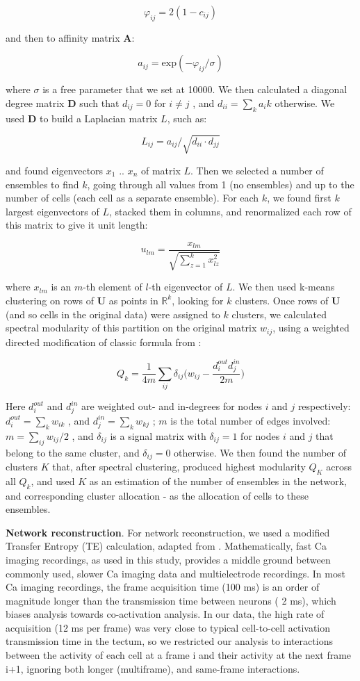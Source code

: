 \documentclass{article}
\begin{document}
$$\varphi_{ij} = 2(1-c_{ij})$$

and then to affinity matrix $\textbf{A}$:

$$a_{ij} = \text{exp}(-\varphi_{ij}/\sigma)$$

where $\sigma$ is a free parameter that we set at 10000. We then calculated a diagonal degree matrix $\textbf{D}$ such that $d_{ij} = 0$ for $i \neq j$ , and $d_{ii} = \sum_k{a_ik}$ otherwise. We used $\textbf{D}$ to build a Laplacian matrix $L$, such as:

$$L_{ij} = a_{ij}/\sqrt{d_{ii}\cdot d_{jj}}$$

and found eigenvectors $x_1$ .. $x_n$ of matrix $L$. Then we selected a number of ensembles to find $k$, going through all values from 1 (no ensembles) and up to the number of cells (each cell as a separate ensemble). For each $k$, we found first $k$ largest eigenvectors of $L$, stacked them in columns, and renormalized each row of this matrix to give it unit length:

$$u_{lm} = \frac{x_{lm}}{\sqrt{\sum_{z=1}^{k}{x_{lz}^2}}}$$

where $x_{lm}$ is an $m$-th element of $l$-th eigenvector of $L$. We then used k-means clustering on rows of $\textbf{U}$ as points in $\mathbb{R}^k$, looking for $k$ clusters. Once rows of $\textbf{U}$ (and so cells in the original data) were assigned to $k$ clusters, we calculated spectral modularity of this partition on the original matrix $w_{ij}$, using a weighted directed modification of classic formula from \citep{newman2006modularity}:

$$Q_k = \frac{1}{4m}\sum_{ij}{\delta_{ij}\Big(w_{ij}-\frac{d^{out}_i d^{in}_j}{2m}}\Big)$$

Here $d^{out}_i$ and $d^{in}_j$ are weighted out- and in-degrees for nodes $i$ and $j$ respectively: $d^{out}_i = \sum_k{w_{ik}}$ , and $d^{in}_j = \sum_k{w_{kj}}$ ; $m$ is the total number of edges involved: $m = \sum_{ij}{w_{ij}}/2$ , and $\delta_{ij}$ is a signal matrix with $\delta_{ij}=1$ for nodes $i$ and $j$ that belong to the same cluster, and $\delta_{ij} = 0$ otherwise. We then found the number of clusters $K$ that, after spectral clustering, produced highest modularity $Q_K$ across all $Q_k$, and used $K$ as an estimation of the number of ensembles in the network, and corresponding cluster allocation - as the allocation of cells to these ensembles.

\textbf{Network reconstruction}. For network reconstruction, we used a modified Transfer Entropy (TE) calculation, adapted from \citep{stetter2012te,gourevitch2007te}. Mathematically, fast Ca imaging recordings, as used in this study, provides a middle ground between commonly used, slower Ca imaging data and multielectrode recordings. In most Ca imaging recordings, the frame acquisition time (100 ms) is an order of magnitude longer than the transmission time between neurons ( 2 ms), which biases analysis towards co-activation analysis. In our data, the high rate of acquisition (12 ms per frame) was very close to typical cell-to-cell activation transmission time in the tectum, so we restricted our analysis to interactions between the activity of each cell at a frame i and their activity at the next frame i+1, ignoring both longer (multiframe), and same-frame interactions.
\end{document}

